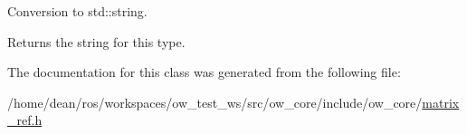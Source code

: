Conversion to std\+::string. 

\begin{DoxyReturn}{Returns}
the string for this type. 
\end{DoxyReturn}


The documentation for this class was generated from the following file\+:\begin{DoxyCompactItemize}
\item 
/home/dean/ros/workspaces/ow\+\_\+test\+\_\+ws/src/ow\+\_\+core/include/ow\+\_\+core/\hyperlink{matrix__ref_8h}{matrix\+\_\+ref.\+h}\end{DoxyCompactItemize}

